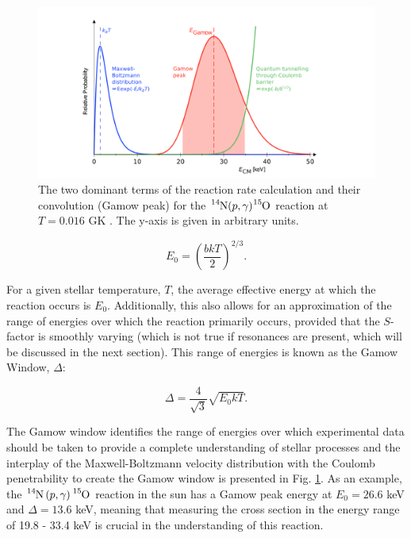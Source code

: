 \begin{figure}
\label{fig: Gamow Peak}
\includegraphics[width=\linewidth]{figures/gamowWindow.png}
\caption{The two dominant terms of the reaction rate calculation and their convolution (Gamow peak) for the $\ce{^{14}N}(p,\gamma)\ce{^{15}O}$ reaction at $T = 0.016$ GK \cite{Bemmerer2004}. The y-axis is given in arbitrary units.}
\end{figure}

\begin{equation}
E_{0} = \left( \dfrac{b k T}{2}  \right)^{2/3}. 
\label{eqn: GamowPeak}
\end{equation}

\noindent For a given stellar temperature, $T$, the average effective energy at which the reaction occurs is $E_{0}$. Additionally, this also allows for an approximation of the range of energies over which the reaction primarily occurs, provided that the $S$-factor is smoothly varying (which is not true if resonances are present, which will be discussed in the next section). This range of energies is known as the Gamow Window, $\Delta$:

\begin{equation}
\Delta = \dfrac{4}{\sqrt{3}} \sqrt{E_{0} k T}.
\label{eqn: Gamow window width}
\end{equation}

\noindent The Gamow window identifies the range of energies over which experimental data should be taken to provide a complete understanding of stellar processes and the interplay of the Maxwell-Boltzmann velocity distribution with the Coulomb penetrability to create the Gamow window is presented in Fig. \ref{fig: Gamow Peak}. As an example, the $\ce{^{14}N} \left( p, \gamma \right) \ce{^{15}O}$ reaction in the sun has a Gamow peak energy at $E_{0} = 26.6$ keV and $\Delta = 13.6$ keV, meaning that measuring the cross section in the energy range of 19.8 - 33.4 keV is crucial in the understanding of this reaction. 

